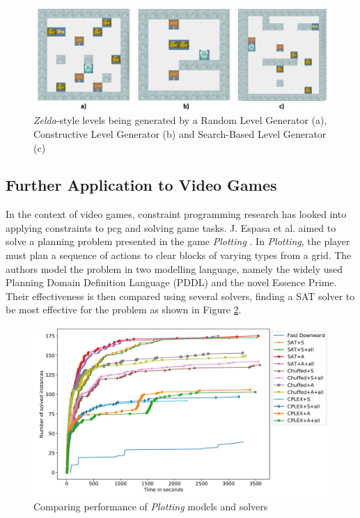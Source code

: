 \begin{figure}[H]
    \centering
    \includegraphics[width=\textwidth, height=0.3\textheight, keepaspectratio]{Images/GVGAILevels.png}
    \caption{\textit{Zelda}-style levels being generated by a Random Level Generator (a), Constructive Level Generator (b) and Search-Based Level Generator (c) \cite{GVG-AI_and_VGDL_Level_Generators}}
    \label{fig:gvgAILevels}
\end{figure}

\subsection{Further Application to Video Games}
In the context of video games, constraint programming research has looked into applying constraints to \acrshort{pcg} and solving game tasks. J. Espasa et al. aimed to solve a planning problem presented in the game \textit{Plotting} \cite{Plotting_Planning_Problem}. In \textit{Plotting}, the player must plan a sequence of actions to clear blocks of varying types from a grid. The authors model the problem in two modelling language, namely the widely used Planning Domain Definition Language (PDDL) and the novel Essence Prime. Their effectiveness is then compared using several solvers, finding a SAT solver to be most effective for the problem as shown in Figure \ref{fig:plottingSolverComparison}.

\begin{figure}[H]
    \centering
    \includegraphics[width=\textwidth, height=0.3\textheight, keepaspectratio]{Images/PlottingSolverComparison.png}
    \caption{Comparing performance of \textit{Plotting} models and solvers \cite{Plotting_Planning_Problem}}
    \label{fig:plottingSolverComparison}
\end{figure}

